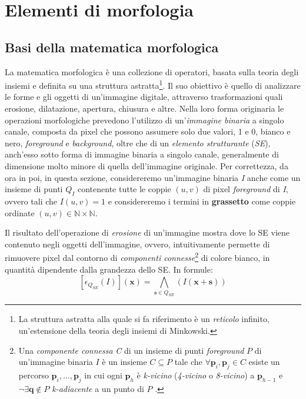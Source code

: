 \section{Elementi di morfologia}
\label{sec:math-morph}

\subsection{Basi della matematica morfologica}
\label{subsec:math-morph-basis}
La matematica morfologica \`e una collezione di operatori, basata sulla teoria degli insiemi e definita su una struttura astratta\footnote{La struttura astratta alla quale si fa riferimento \`e un \textit{reticolo} infinito, un'estensione della teoria degli insiemi di Minkowski.}. Il suo obiettivo \`e quello di analizzare le forme e gli oggetti di un'immagine digitale, attraverso trasformazioni quali erosione, dilatazione, apertura, chiusura e altre. Nella loro forma originaria le operazioni morfologiche prevedono l'utilizzo di un'\textit{immagine binaria} a singolo canale, composta da pixel che possono assumere solo due valori, 1 e 0, bianco e nero, \textit{foreground} e \textit{background}, oltre che di un \textit{elemento strutturante} (\textit{SE}), anch'esso sotto forma di immagine binaria a singolo canale, generalmente di dimensione molto minore di quella dell'immagine originale. Per correttezza, da ora in poi, in questa sezione, considereremo un'immagine binaria \textit{I} anche come un insieme di punti $Q_{I}$ contenente tutte le coppie $(u,v)$ di pixel \textit{foreground} di \textit{I}, ovvero tali che $I(u, v) = 1$ e considereremo i termini in \textbf{grassetto} come coppie ordinate $(u,v) \in \mathbb{N}\times\mathbb{N}$.\par
Il risultato dell'operazione di \textit{erosione} di un'immagine mostra dove lo SE viene contenuto negli oggetti dell'immagine, ovvero, intuitivamente permette di rimuovere pixel dal contorno di \textit{componenti connesse}\footnote{Una \textit{componente connessa} \textit{C} di un insieme di punti \textit{foreground} $P$ di un'immagine binaria $I$ \`e un insieme $C\subseteq P$ tale che $\forall \textbf{p}_{i}, \textbf{p}_{j} \in C$ esiste un percorso $\textbf{p}_{i}, \dots, \textbf{p}_{j}$ in cui ogni $\textbf{p}_{h}$ \`e \textit{k-vicino} (\textit{4-vicino} o \textit{8-vicino}) a $\textbf{p}_{h-1}$ e $\neg \exists \textbf{q}\notin P$ \textit{k-adiacente} a un punto di $P$ \cite{bib:binary-images-connectivity}.} di colore bianco, in quantit\`a dipendente dalla grandezza dello SE. In formule:
\begin{equation}
	\label{eq:erosion}
	[\epsilon_{Q_{SE}}(I)](\textbf{x}) = \underset{\textbf{s}\in Q_{SE}}{\bigwedge}(I(\textbf{x}+\textbf{s}))
\end{equation}\par
